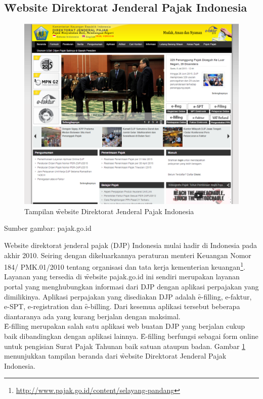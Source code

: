 \subsection{\f{Website} Direktorat Jenderal Pajak Indonesia}
\begin{figure}
	\centering
	\includegraphics[width=\textwidth]
	{pics/pajakweb.PNG}
	\caption{Tampilan \f{website} Direktorat Jenderal Pajak Indonesia}
	\label{fig:pajakweb}
\end{figure}
\begin{center}
	{\small Sumber gambar: pajak.go.id}
\end{center}
Website direktorat jenderal pajak (DJP) Indonesia mulai hadir di Indonesia pada akhir 2010. Seiring dengan dikeluarkannya peraturan menteri Keuangan Nomor 184/ PMK.01/2010 tentang organisasi dan tata kerja kementerian keuangan\footnote{\url{http://www.pajak.go.id/content/selayang-pandang}}. Layanan yang tersedia di \f{website} pajak.go.id ini sendiri merupakan layanan portal yang menghubungkan informasi dari DJP dengan aplikasi perpajakan yang dimilikinya. Aplikasi perpajakan yang disediakan DJP adalah \f{e-filling, e-faktur, e-SPT, e-registration} dan \f{e-billing}. Dari kesemua aplikasi tersebut beberapa diantaranya ada yang kurang berjalan dengan maksimal. 
\newline\\
\f{E-filling} merupakan salah satu aplikasi web buatan DJP yang berjalan cukup baik dibandingkan dengan aplikasi lainnya. \f{E-filling} berfungsi sebagai form online untuk pengisian Surat Pajak Tahunan baik satuan ataupun badan. Gambar \ref{fig:pajakweb} menunjukkan tampilan beranda dari \f{website} Direktorat Jenderal Pajak Indonesia.
